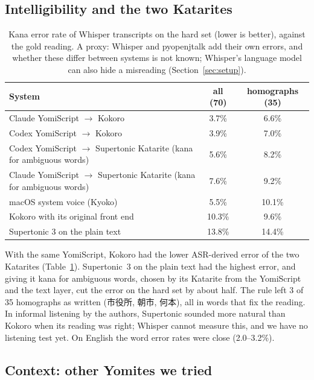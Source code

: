 \documentclass[11pt,a4paper]{article}
\begin{document}
\subsection{Intelligibility and the two Katarites}

\begin{table}[t]
\centering\small
\caption{Kana error rate of Whisper transcripts on the hard set (lower is better), against the gold reading. A proxy:
Whisper and pyopenjtalk add their own errors, and whether these differ between systems is not known; Whisper's language
model can also hide a misreading (Section~\ref{sec:setup}).}
\label{tab:asr}
\begin{tabular}{lcc}
\toprule
System & all (70) & homographs (35)\\
\midrule
Claude YomiScript $\to$ Kokoro & 3.7\% & 6.6\%\\
Codex YomiScript $\to$ Kokoro & 3.9\% & 7.0\%\\
Codex YomiScript $\to$ Supertonic Katarite (kana for ambiguous words) & 5.6\% & 8.2\%\\
Claude YomiScript $\to$ Supertonic Katarite (kana for ambiguous words) & 7.6\% & 9.2\%\\
macOS system voice (Kyoko) & 5.5\% & 10.1\%\\
Kokoro with its original front end & 10.3\% & 9.6\%\\
Supertonic 3 on the plain text & 13.8\% & 14.4\%\\
\bottomrule
\end{tabular}
\end{table}

With the same YomiScript, Kokoro had the lower ASR-derived error of the two Katarites (Table~\ref{tab:asr}). Supertonic~3 on the plain
text had the highest error, and giving it kana for ambiguous words, chosen by its Katarite from the YomiScript and the
text layer, cut the error on the hard set by about half. The rule left 3 of 35 homographs as written (市役所, 朝市,
何本), all in words that fix the reading. In informal listening by the authors, Supertonic sounded more natural than
Kokoro when its reading was right; Whisper cannot measure this, and we have no listening test yet. On English the word
error rates were close (2.0--3.2\%).

\subsection{Context: other Yomites we tried}
\end{document}

